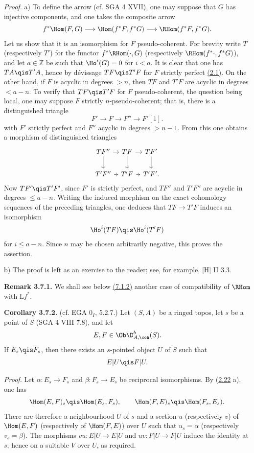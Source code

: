 \emph{Proof.} a) To define the arrow (cf. SGA 4 XVII), one may suppose that \(G\) has injective components, and one takes the composite arrow
\[
  f^*\Hom(F,G)\longrightarrow \Hom(f^*F,f^*G)
  \longrightarrow \RHom(f^*F,f^*G).
\]
Let us show that it is an isomorphism for \(F\) pseudo-coherent. For brevity write \(T\) (respectively \(T'\)) for the functor \(f^*\RHom(\cdot,G)\) (respectively \(\RHom(f^*\cdot,f^*G)\)), and let \(a\in\mathbb Z\) be such that \(\Ho^i(G)=0\) for \(i<a\). It is clear that one has \(TA\qis T'A\), hence by dévissage \(TF\qis T'F\) for \(F\) strictly perfect \hyperlink{sga6.e01.def.2-1}{(2.1)}. On the other hand, if \(F\) is acyclic in degrees \(>n\), then \(TF\) and \(T'F\) are acyclic in degrees \(<a-n\). To verify that \(TF\qis T'F\) for \(F\) pseudo-coherent, the question being local, one may suppose \(F\) strictly \(n\)-pseudo-coherent; that is, there is a distinguished triangle
\[
  F'\longrightarrow F\longrightarrow F''\longrightarrow F'[1].
\]
with \(F'\) strictly perfect and \(F''\) acyclic in degrees \(>n-1\). From this one obtains a morphism of distinguished triangles
\[
\begin{tikzcd}[column sep=tiny]
TF'' \arrow[r] \arrow[d] & TF \arrow[r] \arrow[d] & TF' \arrow[d] \\
T'F'' \arrow[r] & T'F \arrow[r] & T'F' .
\end{tikzcd}
\]
Now \(TF'\qis T'F'\), since \(F'\) is strictly perfect, and \(TF''\) and \(T'F''\) are acyclic in degrees \(\leq a-n\). Writing the induced morphism on the exact cohomology sequences of the preceding triangles, one deduces that \(TF\to T'F\) induces an isomorphism
\[
  \Ho^i(TF)\qis \Ho^i(T'F)
\]
for \(i\leq a-n\). Since \(n\) may be chosen arbitrarily negative, this proves the assertion.

b) The proof is left as an exercise to the reader; see, for example, [H] II 3.3.

\textbf{Remark 3.7.1.} We shall see below \hyperlink{sga6.e01.prop.7-1-2}{(7.1.2)} another case of compatibility of \(\RHom\) with \(\mathrm L f^*\).

\textbf{Corollary 3.7.2.} (cf. EGA \(0_I\), 5.2.7.) Let \((S,A)\) be a ringed topos, let \(s\) be a point of \(S\) (SGA 4 VIII 7.8), and let
\[
  E,F\in\Ob\D^b_{A,\coh}(S).
\]
If \(E_s\qis F_s\), then there exists an \(s\)-pointed object \(U\) of \(S\) such that
\[
  E|U\qis F|U.
\]

\emph{Proof.} Let \(\alpha:E_s\to F_s\) and \(\beta:F_s\to E_s\) be reciprocal isomorphisms. By (\hyperlink{sga6.e01.prop.3-7}{2.22} a), one has
\[
  \Hom(E,F)_s\qis\Hom(E_s,F_s),
  \qquad
  \Hom(F,E)_s\qis\Hom(F_s,E_s).
\]
There are therefore a neighbourhood \(U\) of \(s\) and a section \(u\) (respectively \(v\)) of \(\Hom(E,F)\) (respectively of \(\Hom(F,E)\)) over \(U\) such that \(u_s=\alpha\) (respectively \(v_s=\beta\)). The morphisms \(vu:E|U\to E|U\) and \(uv:F|U\to F|U\) induce the identity at \(s\); hence on a suitable \(V\) over \(U\), as required.

